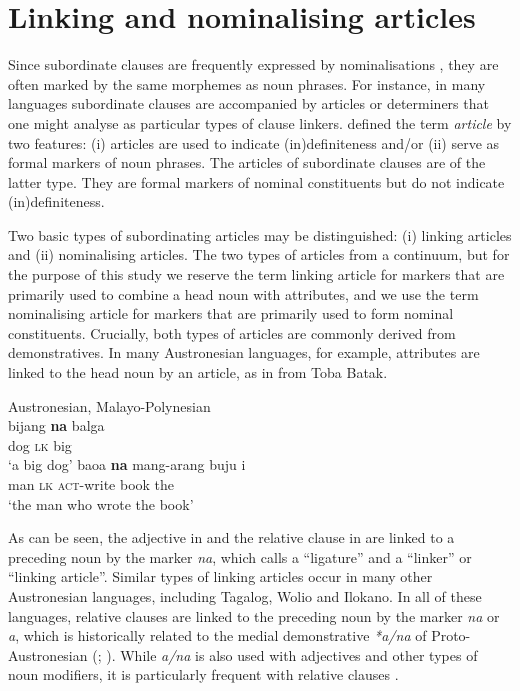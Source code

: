 \documentclass[output=paper,colorlinks,citecolor=brown]{langscibook}
\begin{document}
\section{Linking and nominalising articles}\label{sec:diessel:3}

Since subordinate clauses are frequently expressed by nominalisations \citep{Lehmann1988}, they are often marked by the same morphemes as noun phrases. For instance, in many languages subordinate clauses are accompanied by articles or determiners that one might analyse as particular types of clause linkers. \citet{Dryer1989} defined the term \textit{article} by two features: (i) articles are used to indicate (in)definiteness and/or (ii) serve as formal markers of noun phrases. The articles of subordinate clauses are of the latter type. They are formal markers of nominal constituents but do not indicate (in)definiteness.

Two basic types of subordinating articles may be distinguished: (i) linking articles and (ii) nominalising articles. The two types of articles from a continuum, but for the purpose of this study we reserve the term linking article for markers that are primarily used to combine a head noun with attributes, and we use the term nominalising article for markers that are primarily used to form nominal constituents. Crucially, both types of articles are commonly derived from demonstratives. In many Austronesian languages, for example, attributes are linked to the head noun by an article, as in  from Toba Batak.

\ea\label{ex:diessel:6}
 {Austronesian, Malayo-Polynesian}{\citealt[186]{Foley1980}}\\
\ea\label{ex:diessel:6a}
\gll   bijang  \textbf{na}  balga\\
       dog  \textsc{lk}  big\\
\glt   ‘a big dog’
\ex\label{ex:diessel:6b}
\gll   baoa  \textbf{na}  mang-arang  buju  i\\
       man  \textsc{lk}  \textsc{act-}write  book  the\\
\glt   ‘the man who wrote the book’
\z
\z

As can be seen, the adjective in  and the relative clause in  are linked to a preceding noun by the marker \textit{na}, which \citet[186-187]{Foley1980} calls a “ligature” and \citet[173]{Himmelmann1997} a “linker” or “linking article”. Similar types of linking articles occur in many other Austronesian languages, including Tagalog, Wolio and Ilokano. In all of these languages, relative clauses are linked to the preceding noun by the marker \textit{na} or \textit{a}, which is historically related to the medial demonstrative \textit{*a/na} of Proto-Austronesian (\citealt[164]{Himmelmann1997}; \citealt[100]{Ross1988}). While \textit{a/na} is also used with adjectives and other types of noun modifiers, it is particularly frequent with relative clauses \citep{Foley1980}.
\end{document}
